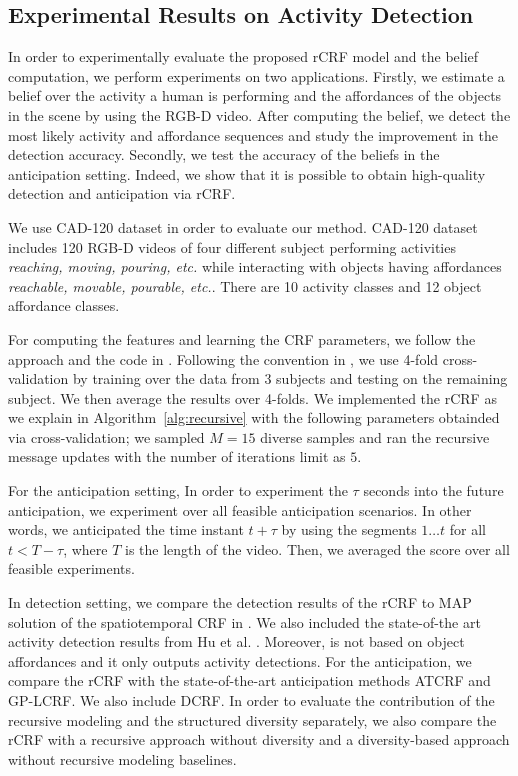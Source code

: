\subsection{Experimental Results on Activity Detection}
In order to experimentally evaluate the proposed rCRF model and the belief computation, we perform experiments on two applications. Firstly, we estimate a belief over the activity a human is performing and the affordances of the objects in the scene by using the RGB-D video. After computing the belief, we detect the most likely activity and affordance sequences and study the improvement in the detection accuracy. Secondly, we test the accuracy of the beliefs in the anticipation setting. Indeed, we show that it is possible to obtain high-quality detection and anticipation via rCRF.




 We use CAD-120 \cite{hemaIJRR} dataset in order to evaluate our method. CAD-120 dataset includes 120 RGB-D videos of four different subject performing activities \emph{reaching, moving, pouring, etc.} while interacting with objects having affordances \emph{reachable, movable, pourable, etc.}. There are 10 activity classes and 12 object affordance classes.

 For computing the features and learning the CRF parameters, we follow the approach and the code in \cite{hemaIJRR}. Following the convention in \cite{hemaIJRR}, we use 4-fold cross-validation by training over the data from 3 subjects and testing on the remaining subject. We then average the results over 4-folds. We implemented the rCRF as we explain in Algorithm~\ref{alg:recursive} with the following parameters obtainded via cross-validation; we sampled $M=15$ diverse samples and ran the recursive message updates with the number of iterations limit as $5$.

For the anticipation setting, In order to experiment the $\tau$ seconds into the future anticipation, we experiment over all feasible anticipation scenarios. In other words, we anticipated the time instant $t+\tau$ by using the segments $1\ldots t$ for all $t<T-\tau$, where $T$ is the length of the video. Then, we averaged the score over all feasible experiments.

 In detection setting, we compare the detection results of the rCRF to MAP solution of the spatiotemporal CRF in \cite{hemaIJRR}. We also included the state-of-the art activity detection results from Hu et al. \cite{latentIcra}. Moreover, \cite{latentIcra} is not based on object affordances and it only outputs activity detections. For the anticipation, we compare the rCRF with the state-of-the-art anticipation methods ATCRF \cite{hemaAnt} and GP-LCRF\cite{gpcrf}. We also include DCRF\cite{ddcrf}. In order to evaluate the contribution of the recursive modeling and the structured diversity separately, we also compare the rCRF with a recursive approach without diversity and a diversity-based approach without recursive modeling baselines.

